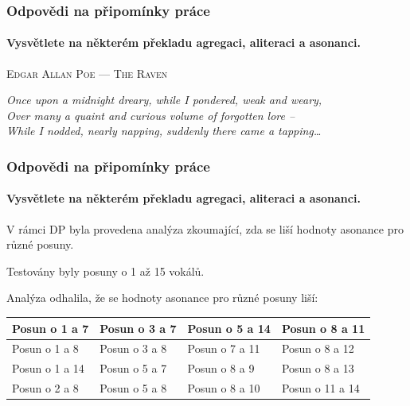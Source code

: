 \documentclass[12pt,xcolor=usenames,dvipsnames]{beamer}
\begin{document}

\begin{frame}[fragile]
	\frametitle{Odpovědi na připomínky práce}
	\framesubtitle{Vysvětlete na některém překladu agregaci, aliteraci a \textbf{asonanci}.}

	{
		\begin{center}
			\textsc{Edgar Allan Poe --- The Raven}
		
			{\small \emph{Once upon a midnight dreary, while I pondered, weak and weary,\\
		Over many a quaint and curious volume of forgotten lore --\\
		While I nodded, nearly napping, suddenly there came a tapping\ldots}}
	
		\end{center}
	}
\pause





\end{frame}	

\begin{frame}[fragile]
	\frametitle{Odpovědi na připomínky práce}
	\framesubtitle{Vysvětlete na některém překladu agregaci, aliteraci a \textbf{asonanci}.}

	V rámci DP byla provedena analýza zkoumající, zda se liší hodnoty asonance pro různé posuny. 
	
	Testovány byly posuny o 1 až 15 vokálů. 
	
	Analýza odhalila, že se hodnoty asonance pro různé posuny liší:

	{\small \begin{tabular}{|l|l|l|l|}
		\hline Posun o 1 a 7  & Posun o 3 a 7 & Posun o 5 a 14 & Posun o 8 a 11  \\ 
		\hline Posun o 1 a 8  & Posun o 3 a 8 & Posun o 7 a 11 & Posun o 8 a 12  \\ 
		\hline Posun o 1 a 14 & Posun o 5 a 7 & Posun o 8 a 9  & Posun o 8 a 13  \\ 
		\hline Posun o 2 a 8  & Posun o 5 a 8 & Posun o 8 a 10 & Posun o 11 a 14 \\ 
		\hline 
	\end{tabular} }


\end{frame}
\end{document}
